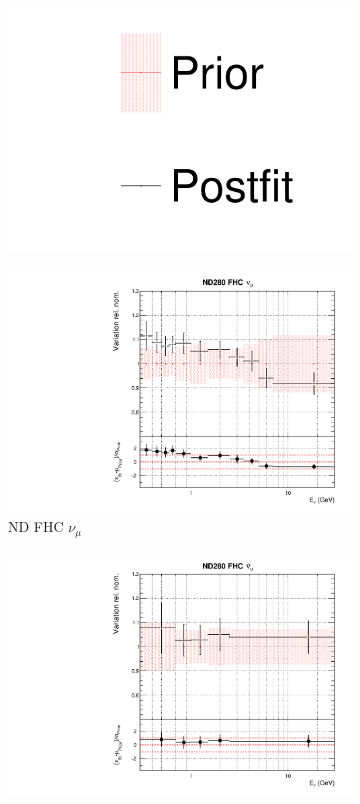 \begin{figure}[!htbp]
\centering
\begin{subfigure}{0.8\textwidth}
  \centering
  \includegraphics[width=0.24\linewidth]{figs/dat_leg}
\end{subfigure}
\begin{subfigure}{0.49\textwidth}
  \centering
  \includegraphics[width=0.99\linewidth]{figs/datflux0}
  \caption{ND FHC $\nu_{\mu}$}
\end{subfigure}
\begin{subfigure}{0.49\textwidth}
  \centering
  \includegraphics[width=0.99\linewidth]{figs/datflux1}

\end{subfigure}
\end{figure}
